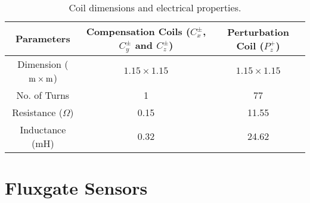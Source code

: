 \begin{table} [!htb]
    \centering
    \begin{tabular} { |c|c|c| } 
        \hline
        Parameters & \makecell{Compensation Coils \\ ($C_x^\pm$, $C_y^\pm$ and $C_z^\pm$)} & \makecell{Perturbation Coil \\ ($P_z^+$)} \\
        \hline\hline
        Dimension ($\rm m\times m$) & $1.15\times1.15$ & $1.15\times1.15$\\ 
        \hline
        No. of Turns & 1 & 77\\ 
        \hline
        Resistance ($\Omega$) & 0.15 & 11.55\\ 
        \hline
        Inductance (mH) & 0.32 & 24.62\\
         \hline
    \end{tabular}
    \caption{Coil dimensions and electrical properties.}\label{table:coil}
\end{table}






\section{Fluxgate Sensors}\label{sec:sensor}

       
